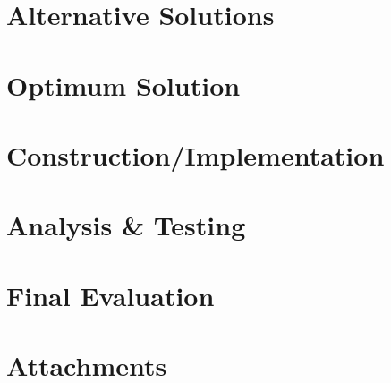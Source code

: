 \documentclass[a4paper, 11pt]{article}
\begin{document}
\section*{Alternative Solutions}

\section*{Optimum Solution}

\section*{Construction/Implementation}

\section*{Analysis \& Testing}

\section*{Final Evaluation}

\section*{Attachments}
\end{document}
